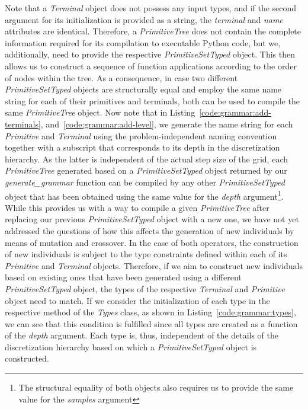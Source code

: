 Note that a \emph{Terminal} object does not possess any input types, and if the second argument for its initialization is provided as a string, the \emph{terminal} and \emph{name} attributes are identical.
Therefore, a \emph{PrimitiveTree} does not contain the complete information required for its compilation to executable Python code, but we, additionally, need to provide the respective \emph{PrimitiveSetTyped} object.
This then allows us to construct a sequence of function applications according to the order of nodes within the tree.  
As a consequence, in case two different \emph{PrimitiveSetTyped} objects are structurally equal and employ the same name string for each of their primitives and terminals, both can be used to compile the same \emph{PrimitiveTree} object.
Now note that in Listing~\ref{code:grammar:add-terminals}, and~\ref{code:grammar:add-level}, we generate the name string for each \emph{Primitive} and \emph{Terminal} using the problem-independent naming convention together with a subscript that corresponds to its depth in the discretization hierarchy.
As the latter is independent of the actual step size of the grid, each \emph{PrimitiveTree} generated based on a \emph{PrimitiveSetTyped} object returned by our \emph{generate\_grammar} function can be compiled by any other \emph{PrimitiveSetTyped} object that has been obtained using the same value for the \emph{depth} argument\footnote{The structural equality of both objects also requires us to provide the same value for the \emph{samples} argument}.
While this provides us with a way to compile a given \emph{PrimitiveTree} after replacing our previous \emph{PrimitiveSetTyped} object with a new one, we have not yet addressed the questions of how this affects the generation of new individuals by means of mutation and crossover.
In the case of both operators, the construction of new individuals is subject to the type constraints defined within each of its \emph{Primitive} and \emph{Terminal} objects.
Therefore, if we aim to construct new individuals based on existing ones that have been generated using a different \emph{PrimitiveSetTyped} object, the types of the respective \emph{Terminal} and \emph{Primitive} object need to match.
If we consider the initialization of each type in the respective method of the \emph{Types} class, as shown in Listing~\ref{code:grammar:types}, we can see that this condition is fulfilled since all types are created as a function of the \emph{depth} argument.
Each type is, thus, independent of the details of the discretization hierarchy based on which a \emph{PrimitiveSetTyped} object is constructed.

